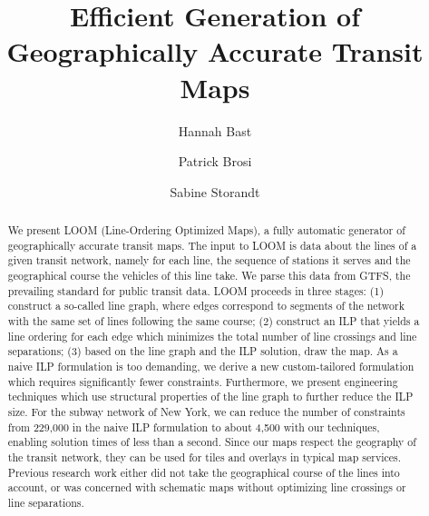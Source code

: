 \documentclass[sigconf]{acmart}
\begin{document}
\title{Efficient Generation of Geographically Accurate Transit Maps}

\author{Hannah Bast}

\author{Patrick Brosi}

\author{Sabine Storandt}


\begin{abstract}
We present LOOM (Line-Ordering Optimized Maps), a fully automatic generator of geographically accurate transit maps.
The input to LOOM is data about the lines of a given transit network, namely for each line, the sequence of stations it serves and the geographical course the vehicles of this line take. We parse this data from GTFS, the prevailing standard for public transit data.
LOOM proceeds in three stages:
	(1) construct a so-called line graph, where edges correspond to segments of the network with the same set of lines following the same course;
	(2) construct an ILP that yields a line ordering for each edge which minimizes the total number of line crossings and line separations;
	(3) based on the line graph and the ILP solution, draw the map.
As a naive ILP formulation is too demanding, we derive a new custom-tailored formulation which requires significantly fewer constraints. Furthermore, we present engineering techniques which use structural properties of the line graph to further reduce the ILP size. For the subway network of New York, we can reduce the number of constraints from 229,000 in the naive ILP formulation to about 4,500 with our techniques, enabling solution times of less than a second. Since our maps respect the geography of the transit network, they can be used for tiles and overlays in typical map services. Previous research work either did not take the geographical course of the lines into account, or was concerned with schematic maps without optimizing line crossings or line separations.
\end{abstract}
\end{document}
